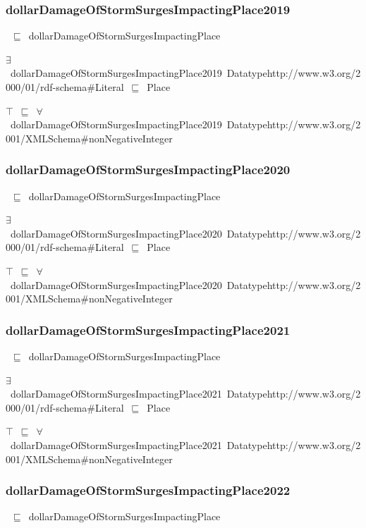 \documentclass{article}
\begin{document}
\subsubsection*{dollarDamageOfStormSurgesImpactingPlace2019}

~\ensuremath{\sqsubseteq}~dollarDamageOfStormSurgesImpactingPlace

\ensuremath{\exists}~dollarDamageOfStormSurgesImpactingPlace2019~Datatypehttp://www.w3.org/2000/01/rdf-schema#Literal~\ensuremath{\sqsubseteq}~Place

\ensuremath{\top}~\ensuremath{\sqsubseteq}~\ensuremath{\forall}~dollarDamageOfStormSurgesImpactingPlace2019~Datatypehttp://www.w3.org/2001/XMLSchema#nonNegativeInteger

\subsubsection*{dollarDamageOfStormSurgesImpactingPlace2020}

~\ensuremath{\sqsubseteq}~dollarDamageOfStormSurgesImpactingPlace

\ensuremath{\exists}~dollarDamageOfStormSurgesImpactingPlace2020~Datatypehttp://www.w3.org/2000/01/rdf-schema#Literal~\ensuremath{\sqsubseteq}~Place

\ensuremath{\top}~\ensuremath{\sqsubseteq}~\ensuremath{\forall}~dollarDamageOfStormSurgesImpactingPlace2020~Datatypehttp://www.w3.org/2001/XMLSchema#nonNegativeInteger

\subsubsection*{dollarDamageOfStormSurgesImpactingPlace2021}

~\ensuremath{\sqsubseteq}~dollarDamageOfStormSurgesImpactingPlace

\ensuremath{\exists}~dollarDamageOfStormSurgesImpactingPlace2021~Datatypehttp://www.w3.org/2000/01/rdf-schema#Literal~\ensuremath{\sqsubseteq}~Place

\ensuremath{\top}~\ensuremath{\sqsubseteq}~\ensuremath{\forall}~dollarDamageOfStormSurgesImpactingPlace2021~Datatypehttp://www.w3.org/2001/XMLSchema#nonNegativeInteger

\subsubsection*{dollarDamageOfStormSurgesImpactingPlace2022}

~\ensuremath{\sqsubseteq}~dollarDamageOfStormSurgesImpactingPlace
\end{document}
